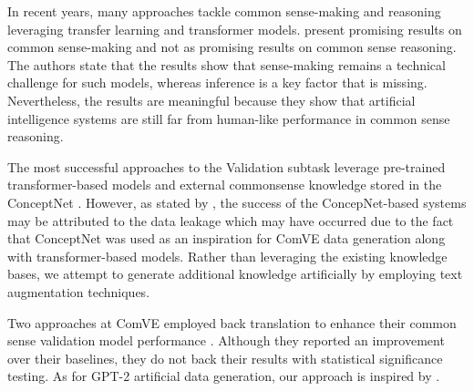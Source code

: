 \documentclass[10pt, a4paper]{article}
\begin{document}

In recent years, many approaches tackle common sense-making and reasoning leveraging transfer learning and transformer models. \citet{wang-etal-2019-make} present promising results on common sense-making and not as promising results on common sense reasoning. The authors state that the results show that sense-making remains a technical challenge for such models, whereas inference is a key factor that is missing. Nevertheless, the results are meaningful because they show that artificial intelligence systems are still far from human-like performance in common sense reasoning.

The most successful approaches to the Validation subtask \citep{zhang-etal-2020-cn,zhao-etal-2020-ecnu} leverage pre-trained transformer-based models and external commonsense knowledge stored in the ConceptNet \cite{conceptnet}. However, as stated by \citet{wang-etal-2020-semeval}, the success of the ConcepNet-based systems may be attributed to the data leakage which may have occurred due to the fact that ConceptNet was used as an inspiration for ComVE data generation along with transformer-based models. Rather than leveraging the existing knowledge bases, we attempt to generate additional knowledge artificially by employing text augmentation techniques.

Two approaches at ComVE employed back translation to enhance their common sense validation model performance \citep{liu-etal-2020-lmve,jon-etal-2020-fit}. Although they reported an improvement over their baselines, they do not back their results with statistical significance testing. As for GPT-2 artificial data generation, our approach is inspired by \citet{kumar-etal-2020-data}.
\end{document}
